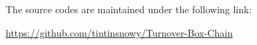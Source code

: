 The source codes are maintained under the following link:

\url{https://github.com/tintinsnowy/Turnover-Box-Chain}



